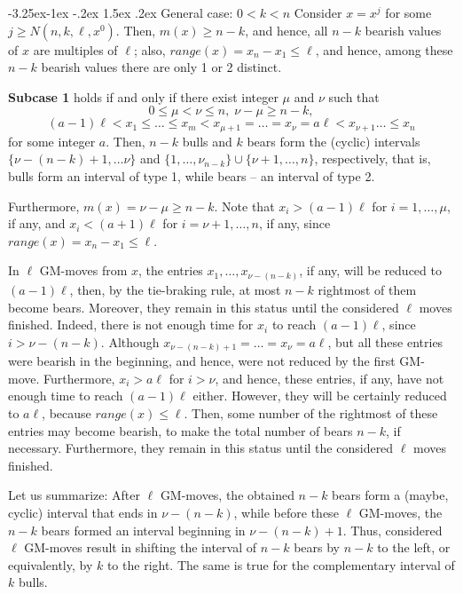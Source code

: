 \documentclass[10pt]{article}
\makeatletter
\renewcommand\subsection{\@startsection{subsection}{2}{\z@}
{-3.25ex\@plus -1ex \@minus -.2ex}
{1.5ex \@plus .2ex}
{\normalfont\normalsize\bfseries\boldmath}}
\theoremstyle{definition}
\makeatother
\begin{document}
\subsection{General case: $0 < k < n$}
Consider  $x = x^j$  for some $j \geq N(n,k,\ell,x^0)$. 
Then, $m(x) \geq n-k$, 
and hence, all $n-k$ bearish values of $x$  are multiples of $\ell$; 
also, $range(x) = x_n - x_1 \leq \ell$, 
and hence, among these  $n-k$ bearish values 
there are only 1 or 2 distinct. 

\medskip 

{\bf Subcase 1}  holds if and only if  
there exist integer $\mu$ and $\nu$  such that  
$$0 \leq \mu < \nu \leq n, \; \nu-\mu \geq n-k,$$  
$$(a-1) \ell < x_1 \leq \ldots \leq x_m < 
x_{\mu+1} = \ldots = x_\nu = a \ell 
< x_{\nu+1} \ldots \leq x_n$$ 
for some integer $a$.   
Then,  $n-k$ bulls and $k$ bears 
form the (cyclic) intervals   
\newline
$\{\nu-(n-k)+1, \ldots \nu\}$  and 
$\{1,\ldots,\nu_{n-k}\} \cup \{\nu+1,\ldots,n\}$, 
respectively, that is, bulls form an 
interval of type 1, 
while bears -- an interval of type 2.

Furthermore, 
$m(x) = \nu-\mu \geq n-k$.
Note that $x_i > (a-1) \ell$ 
for $i = 1, \ldots, \mu$, if any, 
and  $x_i < (a+1) \ell$ 
for $i = \nu+1, \ldots, n$, if any,  
since  $range(x) = x_n - x_1 \leq \ell$. 

\medskip 

In  $\ell$  GM-moves from $x$,  
the entries $x_1, \ldots, x_{\nu - (n-k)}$, if any,   
will be reduced to $(a-1) \ell$, 
then, by the tie-braking rule, 
at most  $n-k$  rightmost of them become bears.
Moreover, they remain in this status until 
the considered $\ell$  moves finished. 
Indeed, there is not enough time 
for  $x_i$  to reach  $(a-1) \ell$, since $i > \nu - (n-k)$. 
Although $x_{\nu - (n-k) + 1} = \ldots = x_\nu = a \ell$, 
but all these entries were bearish in the beginning, 
and hence, were not reduced by the first GM-move. 
Furthermore, $x_i > a \ell$  for $i > \nu$, 
and hence, these entries, if any, have not 
enough time to reach $(a-1) \ell$ either. 
However, they will be certainly reduced to $a \ell$, 
because $range(x) \leq \ell$.
Then, some number of the 
rightmost of these entries may become bearish,  
to make the total number of bears $n-k$, if necessary.
Furthermore, they remain in this status until 
the considered  $\ell$  moves finished. 

Let us summarize:  
After  $\ell$  GM-moves, 
the obtained $n-k$ bears form 
a (maybe, cyclic) interval that ends 
in $\nu - (n-k)$, 
while before these $\ell$ GM-moves,   
the  $n-k$  bears formed an interval 
beginning in $\nu-(n-k)+1$. 
Thus, considered $\ell$ GM-moves result 
in shifting the interval of $n-k$ bears 
by $n-k$ to the left, 
or equivalently, by  $k$ to the right.
The same is true for the complementary  
interval of $k$ bulls. 
\end{document}
